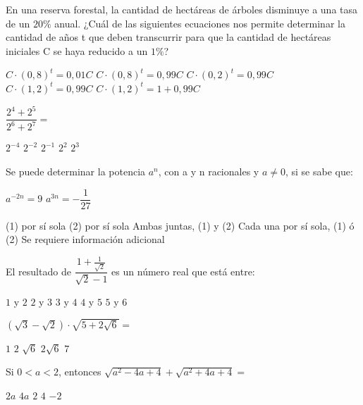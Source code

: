 \documentclass[revolver]{srs}
\begin{document}
\begin{preguntas}[after-item-skip=2cm]
\pregunta En una reserva forestal, la cantidad de hectáreas de árboles disminuye a una tasa de un $20\%$ anual. ¿Cuál de las siguientes ecuaciones nos permite determinar la cantidad de años t que deben transcurrir para que la cantidad de hectáreas iniciales C se haya reducido a un $1\%$?
\begin{vertical}
\alternativa $C \cdot \left(0,8\right)^t = 0,01 C$
\alternativa $C \cdot \left(0,8\right)^t = 0,99 C$
\alternativa $C \cdot \left(0,2\right)^t = 0,99 C$
\alternativa $C \cdot \left(1,2\right)^t = 0,99 C$
\alternativa $C \cdot \left(1,2\right)^t = 1 + 0,99 C$
\end{vertical}

\pregunta $\dfrac{2^4 + 2^5}{2^6 + 2^7} =$
\begin{vertical}
\alternativa $2^{-4}$
\alternativa $2^{-2}$
\alternativa $2^{-1}$
\alternativa $2^2$
\alternativa $2^3$
\end{vertical}


\pregunta Se puede determinar la potencia $a^n$, con a y n racionales y $a \neq 0$, si se sabe que:
\begin{verticaln}
\alternativa $a^{-2n} = 9$
\alternativa $a^{3n} = -\dfrac{1}{27}$
\end{verticaln}
\begin{vertical}
\alternativa (1) por sí sola
\alternativa (2) por sí sola
\alternativa Ambas juntas, (1) y (2)
\alternativa Cada una por sí sola, (1) ó (2)
\alternativa Se requiere información adicional
\end{vertical}

\pregunta El resultado de $\dfrac{1 + \frac{1}{\sqrt{2}}}{\sqrt{2} - 1}$ es un número real que está entre:
\begin{vertical}
\alternativa $1$ y $2$
\alternativa $2$ y $3$
\alternativa $3$ y $4$
\alternativa $4$ y $5$
\alternativa $5$ y $6$
\end{vertical}

\pregunta $\left(\sqrt{3} - \sqrt{2}\right) \cdot \sqrt{5 + 2\sqrt{6}} =$
\begin{vertical}
\alternativa $1$
\alternativa $2$
\alternativa $\sqrt{6}$
\alternativa $2\sqrt{6}$
\alternativa $7$
\end{vertical}

\pregunta Si $0 < a < 2$, entonces $\sqrt{a^2 - 4a + 4} + \sqrt{a^2 + 4a + 4} =$
\begin{vertical}
\alternativa $2a$
\alternativa $4a$
\alternativa $2$
\alternativa $4$
\alternativa $-2$
\end{vertical}


\end{preguntas}
\end{document}
